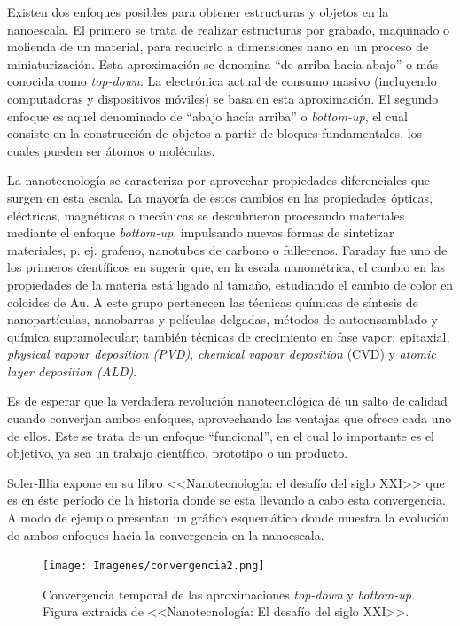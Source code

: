 		Existen dos enfoques posibles para obtener estructuras y objetos en la nanoescala. El primero se trata de realizar estructuras por grabado, maquinado o molienda de un material, para reducirlo a dimensiones nano en un proceso de miniaturización. Esta aproximación se denomina ``de arriba hacia abajo'' o más conocida como \textit{top-down}. La electrónica actual de consumo masivo (incluyendo computadoras y dispositivos móviles) se basa en esta aproximación. El segundo enfoque es aquel denominado de ``abajo hacía arriba'' o \textit{bottom-up}, el cual consiste en la construcción de objetos a partir de bloques fundamentales, los cuales pueden ser átomos o moléculas. 

		La nanotecnología se caracteriza por aprovechar propiedades diferenciales que surgen en esta escala. La mayoría de estos cambios en las propiedades ópticas, eléctricas, magnéticas o mecánicas se descubrieron procesando materiales mediante el enfoque \textit{bottom-up}, impulsando nuevas formas de sintetizar materiales, p. ej. grafeno, nanotubos de carbono o fullerenos. Faraday fue uno de los primeros científicos en sugerir que, en la escala nanométrica, el cambio en las propiedades de la materia está ligado al tamaño, estudiando el cambio de color en coloides de Au\cite{faraday1857}. A este grupo pertenecen las técnicas químicas de síntesis de nanopartículas, nanobarras y películas delgadas, métodos de autoensamblado y química supramolecular; también técnicas de crecimiento en fase vapor: epitaxial, \textit{physical vapour deposition (PVD)}, \textit{chemical vapour deposition} (CVD) y \textit{atomic layer deposition (ALD)}.
			
		Es de esperar que la verdadera revolución nanotecnológica dé un salto de calidad cuando converjan ambos enfoques, aprovechando las ventajas que ofrece cada uno de ellos. Este se trata de un enfoque ``funcional'', en el cual lo importante es el objetivo, ya sea un trabajo científico, prototipo o un producto.

		Soler-Illia expone en su libro <<Nanotecnología: el desafío del siglo XXI>>\cite{nanotecnologia-galo} que es en éste período de la historia donde se esta llevando a cabo esta convergencia. A modo de ejemplo presentan un gráfico esquemático donde muestra la evolución de ambos enfoques hacia la convergencia en la nanoescala.

			\begin{figure}[ht!]
 				\begin{center}
 				\texttt{[image: Imagenes/convergencia2.png]}
 				\caption[Convergencia \textit{top-down }y \textit{bottom-up.}]{Convergencia temporal de las aproximaciones \textit{top-down }y \textit{bottom-up.} Figura extraída de <<Nanotecnología: El desafío del siglo XXI>>.\cite{nanotecnologia-galo}}
 				\label{fig:galo-convergencia}
 		   	    \end{center}
 		   	    \end{figure}

